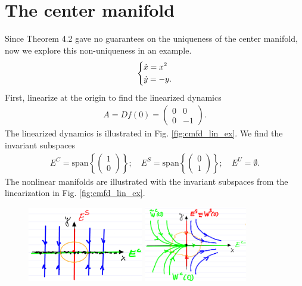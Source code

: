 \section{The center manifold}
\begin{ex}
	Since Theorem 4.2 gave no guarantees on the uniqueness of the center manifold, now we explore this non-uniqueness in an example.
	\begin{align}
\begin{dcases}
	\dot{x} = x^2 \\
	\dot{y} = -y.
\end{dcases}
	\end{align}
	First, linearize at the origin to find the linearized dynamics
	\begin{align}
		A = Df(0) = 
		\begin{pmatrix}
			0 & 0 \\ 0 & -1
		\end{pmatrix}
		.
	\end{align}
	The linearized dynamics is illustrated in Fig. \ref{fig:cmfd_lin_ex}. We find the invariant subspaces
	\begin{align}
		E^{C} =  \textrm{span}\left\{ 
			\begin{pmatrix}
				1 \\ 0 
			\end{pmatrix}
		\right\};\quad
		E^{S} =  \textrm{span}  \left\{
			\begin{pmatrix}
				0 \\ 1
			\end{pmatrix}
		\right\}; \quad
		E^{U} = \emptyset.
	\end{align}
	The nonlinear manifolds are illustrated with the invariant subspaces from the linearization in Fig. \ref{fig:cmfd_lin_ex}.
	\begin{figure}[h!]
		\centering
		\includegraphics[width=0.45\textwidth]{figures/ch3/2cmfd_lin_ex.png}
		\includegraphics[width=0.4\textwidth]{figures/ch3/3cmfd_nonlin_ex.png}

\end{figure}
\end{ex}

